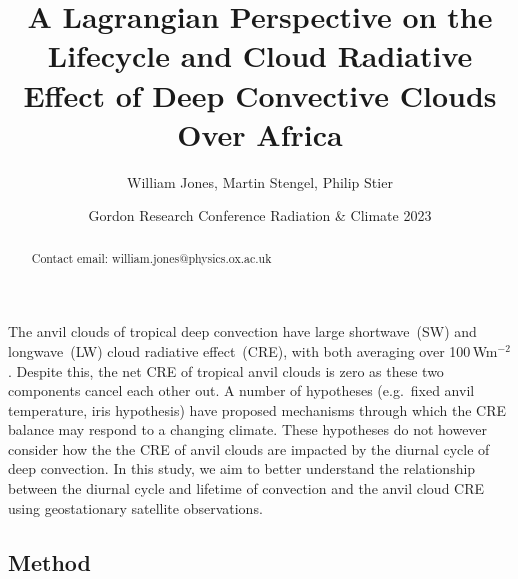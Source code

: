 \documentclass{tufte-handout}
\title{A Lagrangian Perspective on the Lifecycle and Cloud Radiative Effect of Deep Convective Clouds Over Africa}
\author[William Jones]{William Jones, Martin Stengel, Philip Stier}
\date{Gordon Research Conference Radiation \& Climate 2023}  %
\begin{document}
\maketitle%

\begin{abstract}
\noindent Contact email: william.jones@physics.ox.ac.uk
\end{abstract}



The anvil clouds of tropical deep convection have large shortwave~(SW) and longwave~(LW) cloud radiative effect~(CRE), with both averaging over 100\,Wm$^{-2}$.
Despite this, the net CRE of tropical anvil clouds is zero as these two components cancel each other out\cite[-3.5\baselineskip]{hartmann_balanced_2017}.
A number of hypotheses (e.g.\ fixed anvil temperature\cite{hartmann_important_2002}, iris hypothesis\cite{lindzen_does_2001}) have proposed mechanisms through which the CRE balance may respond to a changing climate.
These hypotheses do not however consider how the the CRE of anvil clouds are impacted by the diurnal cycle of deep convection.
In this study, we aim to better understand the relationship between the diurnal cycle and lifetime of convection and the anvil cloud CRE using geostationary satellite observations.


\subsection{Method}\label{sec:method}
\end{document}
